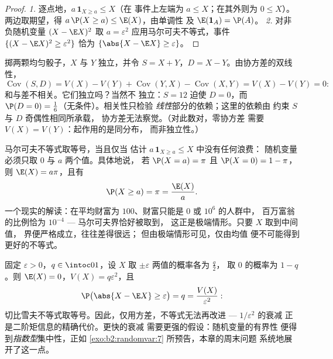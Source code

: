\begin{proof}
\emph{1.} 逐点地，$a\,\mathbf{1}_{X \geq a} \leq X$（在
事件上左端为 $a \leq X$；在其外则为 $0 \leq X$）。
两边取期望，得 $a\,\P(X \geq a) \leq \E(X)$，由单调性
及 $\E(\mathbf{1}_A) = \P(A)$。
\emph{2.} 对非负随机变量 $(X - \E
X)^2$ 取 $a = \varepsilon^2$ 应用马尔可夫不等式，事件 $\{(X - \E X)^2
\geq \varepsilon^2\}$ 恰为 $\{\abs{X - \E X} \geq
\varepsilon\}$。
\end{proof}

\begin{example}\label{ex:b2:randomvar:sumdiff}
掷两颗均匀骰子，$X$ 与 $Y$ 独立，并令 $S = X +
Y$，$D = X - Y$。由协方差的双线性，
\[
\operatorname{Cov}(S, D) = V(X) - V(Y) +
\operatorname{Cov}(Y, X) - \operatorname{Cov}(X, Y) = V(X) -
V(Y) = 0 :
\]
和与差不相关。它们独立吗？当然不
独立：$S = 12$ 迫使 $D = 0$，而 $\P(D = 0) =
\frac16$（无条件）。相关性只检验
\emph{线性}部分的依赖；这里的依赖由
约束 $S$ 与 $D$ 奇偶性相同所承载，
协方差无法察觉。（对此数对，零协方差
需要 $V(X) = V(Y)$：起作用的是同分布，
而非独立性。）
\end{example}

\begin{example}[马尔可夫不等式何时取等]\label{ex:b2:randomvar:markovsharp}
马尔可夫不等式取等号，当且仅当
估计 $a\,\mathbf 1_{X\geq a} \leq X$ 中没有任何浪费：
随机变量必须只取 $0$ 与 $a$ 两个值。具体地说，
若 $\P(X = a) = \pi$ 且 $\P(X = 0) = 1 - \pi$，则 $\E(X)
= a\pi$，且有
\[
\P(X \geq a) = \pi = \frac{\E(X)}{a} .
\]
一个现实的解读：在平均财富为
$100$、财富只能是 $0$ 或 $10^6$ 的人群中，
百万富翁的比例恰为 $10^{-4}$ --- 马尔可夫界恰好被取到，
这正是极端情形。只要 $X$ 取到中间值，
界便严格成立，往往差得很远；
但由极端情形可见，仅由均值
便不可能得到更好的不等式。
\end{example}

\begin{example}\label{ex:b2:randomvar:chebsharp}
固定 $\varepsilon > 0$，$q \in \intoc01$，设 $X$ 取
$\pm\varepsilon$ 两值的概率各为 $\frac q2$，
取 $0$ 的概率为 $1 - q$。则 $\E(X) = 0$，$V(X) =
q\varepsilon^2$，且
\[
\P\bigl(\abs{X - \E X} \geq \varepsilon\bigr) = q
= \frac{V(X)}{\varepsilon^2} :
\]
切比雪夫不等式取等号。因此，仅用方差，不等式无法再改进
--- $1/\varepsilon^2$ 的衰减
正是二阶矩信息的精确代价。更快的衰减
需要更强的假设：随机变量的有界性
便得到\emph{指数型}集中性，正如
\cref{exo:b2:randomvar:7} 所预告，本章的周末问题
系统地展开了这一点。
\end{example}

